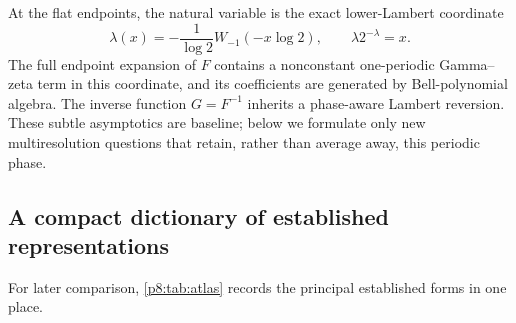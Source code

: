 \documentclass[11pt]{article}
\theoremstyle{definition}
\theoremstyle{remark}
\begin{document}
At the flat endpoints, the natural variable is the exact lower-Lambert
coordinate~\cite{p8:corless1996}
\begin{equation}
 \lambda(x)=-\frac{1}{\log2}
 W_{-1}(-x\log2),
 \qquad \lambda2^{-\lambda}=x.                           \label{p8:eq:lower-lambert}
\end{equation}
The full endpoint expansion of $F$ contains a nonconstant one-periodic
Gamma--zeta term in this coordinate, and its coefficients are generated by
Bell-polynomial algebra.  The inverse function $G=F^{-1}$ inherits a
phase-aware Lambert reversion.  These subtle asymptotics are baseline; below
we formulate only new multiresolution questions that retain, rather than
average away, this periodic phase.

\subsection{A compact dictionary of established representations}

For later comparison, \cref{p8:tab:atlas} records the principal established
forms in one place.
\end{document}
